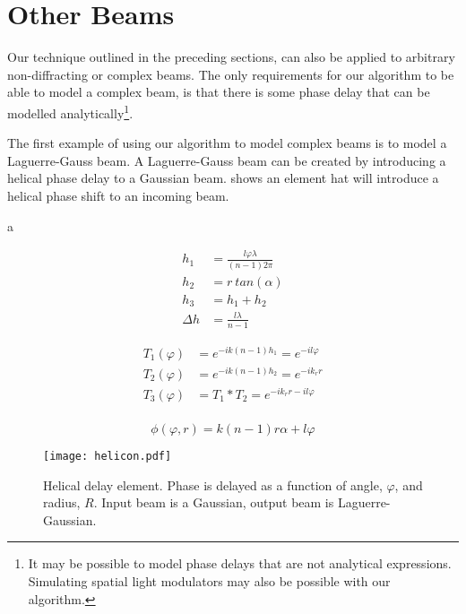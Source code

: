 \section{Other Beams}

Our technique outlined in the preceding sections, can also be applied to arbitrary non-diffracting or complex beams. The only requirements for our algorithm to be able to model a complex beam, is that there is some phase delay that can be modelled analytically\footnote{It may be possible to model phase delays that are not analytical expressions. Simulating spatial light modulators may also be possible with our algorithm.}.

The first example of using our algorithm to model complex beams is to model a Laguerre-Gauss beam. A Laguerre-Gauss beam can be created by introducing a helical phase delay to a Gaussian beam.
 shows an element hat will introduce a helical phase shift to an incoming beam.

a~\cite{wei2015generation,qiong2012generalization,topuzoski2009conversion,kotlyar2006diffraction,khonina1992trochoson}%


\begin{align}
h_1&=\frac{l\varphi\lambda}{(n-1)2\pi}\\
h_2&=r\ tan(\alpha)\\
h_3&=h_1+h_2\\
\Delta h &= \frac{l\lambda}{n-1}
\end{align}


\begin{align}
T_1(\varphi)&=e^{-ik(n-1)h_1}=e^{-il\varphi}\\
T_2(\varphi)&=e^{-ik(n-1)h_2}=e^{-ik_rr}\\
T_3(\varphi)&=T_1*T_2=e^{-ik_rr-il\varphi}\\
\end{align}

\begin{equation}
\phi(\varphi,r)=k(n-1)r\alpha+l\varphi
\end{equation}


\begin{figure}[!ht]
    \centering
    \texttt{[image: helicon.pdf]}
    \caption{Helical delay element. Phase is delayed as a function of angle, $\varphi$, and radius, $R$. Input beam is a Gaussian, output beam is Laguerre-Gaussian.}
    \label{fig:helix}
\end{figure}

